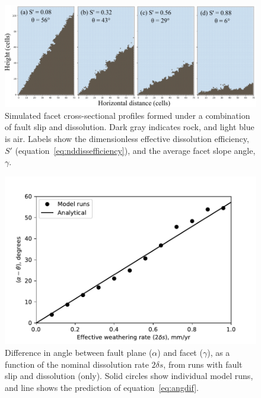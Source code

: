 \begin{figure}[ht!]
\centerline{\includegraphics{Figures/dissolution_model_profiles.pdf}}
\caption{Simulated facet cross-sectional profiles formed under a combination of fault slip and dissolution. Dark gray indicates rock, and light blue is air. Labels show the dimensionless effective dissolution efficiency, $S'$ (equation~\ref{eq:nddissefficiency}), and the average facet slope angle, $\gamma$.}
\label{fig:dissruns}
\end{figure}

\begin{figure}[ht!]
\centerline{\includegraphics{Figures/angle_vs_dissolution.pdf}}
\caption{Difference in angle between fault plane ($\alpha$) and facet ($\gamma$), as a function of the nominal dissolution rate $2\delta s$, from runs with fault slip and dissolution (only). Solid circles show individual model runs, and line shows the prediction of equation~\ref{eq:angdif}.}
\label{fig:angdiss}
\end{figure}

